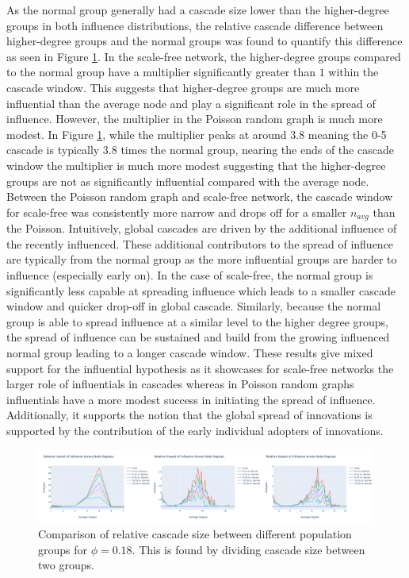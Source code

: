\documentclass[10pt, oneside, reqno]{amsart}
\theoremstyle{plain}%
\theoremstyle{definition}
\theoremstyle{remark}
\begin{document}
As the normal group generally had a cascade size lower than the higher-degree groups in both influence distributions, the relative cascade difference between higher-degree groups and the normal groups was found to quantify this difference as seen in Figure \ref{Mult18}.
In the scale-free network, the higher-degree groups compared to the normal group have a multiplier significantly greater than $1$ within the cascade window.
This suggests that higher-degree groups are much more influential than the average node and play a significant role in the spread of influence.
However, the multiplier in the Poisson random graph is much more modest. In Figure \ref{Mult18}, while the multiplier peaks at around $3.8$ meaning the 0-5 cascade is typically $3.8$ times the normal group, nearing the ends of the cascade window the multiplier is much more modest suggesting that the higher-degree groups are not as significantly influential compared with the average node.
Between the Poisson random graph and scale-free network, the cascade window for scale-free was consistently more narrow and drops off for a smaller $n_{avg}$ than the Poisson. 
Intuitively, global cascades are driven by the additional influence of the recently influenced.
These additional contributors to the spread of influence are typically from the normal group as the more influential groups are harder to influence (especially early on).
In the case of scale-free, the normal group is significantly less capable at spreading influence which leads to a smaller cascade window and quicker drop-off in global cascade.
Similarly, because the normal group is able to spread influence at a similar level to the higher degree groups, the spread of influence can be sustained and build from the growing influenced normal group leading to a longer cascade window.
These results give mixed support for the influential hypothesis as it showcases for scale-free networks the larger role of influentials in cascades whereas in Poisson random graphs influentials have a more modest success in initiating the spread of influence.
Additionally, it supports the notion that the global spread of innovations is supported by the contribution of the early individual adopters of innovations.

\begin{figure}[ht]
    \includegraphics[scale=0.2]{Report/figs/Multiplier18.png}
    \caption{Comparison of relative cascade size between different population groups for $\phi = 0.18$. This is found by dividing cascade size between two groups. }
    \label{Mult18}
\end{figure}
\end{document}
